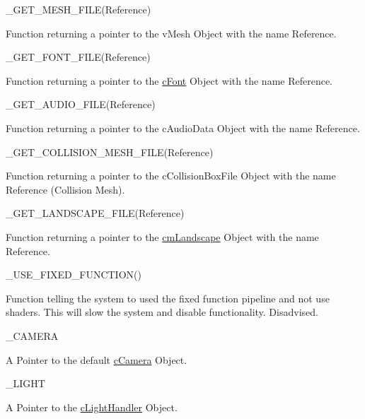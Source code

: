 \begin{DoxyItemize}
\begin{DoxyItemize}
\end{DoxyItemize}
\item \_\-GET\_\-MESH\_\-FILE(Reference)
\begin{DoxyItemize}
\item Function returning a pointer to the vMesh Object with the name Reference.
\end{DoxyItemize}
\item \_\-GET\_\-FONT\_\-FILE(Reference)
\begin{DoxyItemize}
\item Function returning a pointer to the \hyperlink{classc_font}{cFont} Object with the name Reference.
\end{DoxyItemize}
\item \_\-GET\_\-AUDIO\_\-FILE(Reference)
\begin{DoxyItemize}
\item Function returning a pointer to the cAudioData Object with the name Reference.
\end{DoxyItemize}
\item \_\-GET\_\-COLLISION\_\-MESH\_\-FILE(Reference)
\begin{DoxyItemize}
\item Function returning a pointer to the cCollisionBoxFile Object with the name Reference (Collision Mesh).
\end{DoxyItemize}
\item \_\-GET\_\-LANDSCAPE\_\-FILE(Reference)
\begin{DoxyItemize}
\item Function returning a pointer to the \hyperlink{classcm_landscape}{cmLandscape} Object with the name Reference.
\end{DoxyItemize}
\item \_\-USE\_\-FIXED\_\-FUNCTION()
\begin{DoxyItemize}
\item Function telling the system to used the fixed function pipeline and not use shaders. This will slow the system and disable functionality. Disadvised.
\end{DoxyItemize}
\item \_\-CAMERA
\begin{DoxyItemize}
\item A Pointer to the default \hyperlink{classc_camera}{cCamera} Object.
\end{DoxyItemize}
\item \_\-LIGHT
\begin{DoxyItemize}
\item A Pointer to the \hyperlink{classc_light_handler}{cLightHandler} Object.

\end{DoxyItemize}
\end{DoxyItemize}
